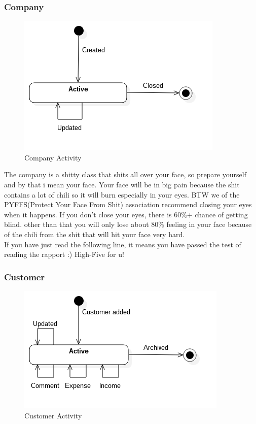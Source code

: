 \subsubsection*{Company}

\begin{figure}[H]
    \centering
    \includegraphics[scale=0.7]{Images/ProblemDomain/companyActivityDiagram.png}
    \caption{Company Activity}
    \label{fig:companyActivityDiagram}
\end{figure}

The company is a shitty class that shits all over your face, so prepare yourself and by that i mean your face. Your face will be in big pain because the shit contains a lot of chili so it will burn especially in your eyes. BTW we of the PYFFS(Protect Your Face From Shit) association recommend closing your eyes when it happens. If you don't close your eyes, there is 60\%+ chance of getting blind. other than that you will only lose about 80\% feeling in your face because of the chili from the shit that will hit your face very hard. \\
If you have just read the following line, it means you have passed the test of reading the rapport :) High-Five for u!


\subsubsection*{Customer}

\begin{figure}[H]
    \centering
    \includegraphics[scale=0.7]{Images/ProblemDomain/customerActivityDiagram.png}
    \caption{Customer Activity}
    \label{fig:customerActivityDiagram}
\end{figure}


